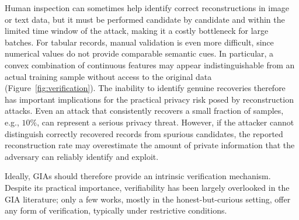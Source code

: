 Human inspection can sometimes help identify correct reconstructions in image or text data, but it must be performed candidate by candidate and within the limited time window of the attack, making it a costly bottleneck for large batches. For tabular records, manual validation is even more difficult, since numerical values do not provide comparable semantic cues. In particular, a convex combination of continuous features may appear indistinguishable from an actual training sample without access to the original data (Figure~\ref{fig:verification}). The inability to identify genuine recoveries therefore has important implications for the practical privacy risk posed by reconstruction attacks. Even an attack that consistently recovers a small fraction of samples, e.g., $10\%$, can represent a serious privacy threat. However, if the attacker cannot distinguish correctly recovered records from spurious candidates, the reported reconstruction rate may overestimate the amount of private information that the adversary can reliably identify and exploit.


Ideally, GIAs should therefore provide an intrinsic verification mechanism. Despite its practical importance, verifiability has been largely overlooked in the GIA literature; only a few works, mostly in the honest-but-curious setting, offer any form of verification, typically under restrictive conditions.




